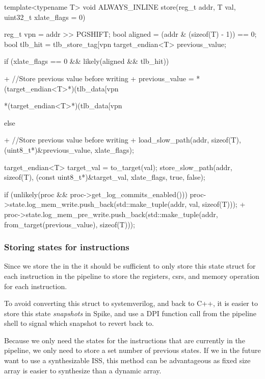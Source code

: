 \begin{clisting}[caption={Modified \ccode{store()} function from \file{mmu.h} with new lines marked with \ccode{+}.}, label={lst:store}]
  template<typename T>
  void ALWAYS_INLINE store(reg_t addr, T val, uint32_t xlate_flags = 0) {
    reg_t vpn = addr >> PGSHIFT;
    bool aligned = (addr & (sizeof(T) - 1)) == 0;
    bool tlb_hit = tlb_store_tag[vpn %
    target_endian<T> previous_value;


    if (xlate_flags == 0 && likely(aligned && tlb_hit)) {
+     //Store previous value before writing
+     previous_value = *(target_endian<T>*)(tlb_data[vpn %

      *(target_endian<T>*)(tlb_data[vpn %
    } else {
+     //Store previous value before writing
+     load_slow_path(addr, sizeof(T), (uint8_t*)&previous_value, xlate_flags);

      target_endian<T> target_val = to_target(val);
      store_slow_path(addr, sizeof(T), (const uint8_t*)&target_val, xlate_flags, true, false);
    }

    if (unlikely(proc && proc->get_log_commits_enabled())) {
      proc->state.log_mem_write.push_back(std::make_tuple(addr, val, sizeof(T)));
+     proc->state.log_mem_pre_write.push_back(std::make_tuple(addr, from_target(previous_value), sizeof(T)));
    }
  }
\end{clisting}



\subsubsection{Storing states for instructions}

Since we store the  in the  it should be sufficient to only store this state struct for each instruction in the pipeline to store the registers, \acrshort{csr}s, and memory operation for each instruction. 

To avoid converting this struct to systemverilog, and back to C++, it is easier to store this state \textit{snapshots} in Spike, and use a DPI function call from the pipeline shell to signal which snapshot to revert back to.

Because we only need the states for the instructions that are currently in the pipeline, we only need to store a set number of previous states. If we in the future want to use a synthesizable ISS, this method can be advantageous as fixed size array is easier to synthesize than a dynamic array.

